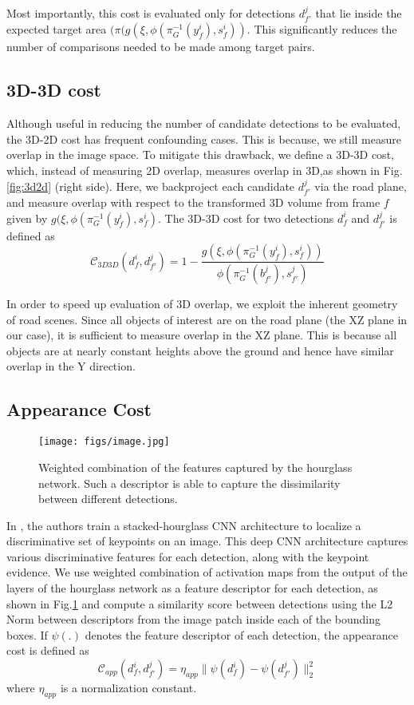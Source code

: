 \documentclass[letterpaper, 10 pt, conference]{ieeeconf}
\begin{document}
Most importantly, this cost is evaluated only for detections $d^j_{f'}$ that lie inside the expected target area $(\pi(g(\xi, \phi(\pi_G^{-1}(y^i_f), s^i_f))$. This significantly reduces the number of comparisons needed to be made among target pairs.

\subsection{3D-3D cost}

Although useful in reducing the number of candidate detections to be evaluated, the 3D-2D cost has frequent confounding cases. This is because, we still measure overlap in the image space. To mitigate this drawback, we define a 3D-3D cost, which, instead of measuring 2D overlap, measures overlap in 3D,as shown in Fig.\ref{fig:3d2d} (right side). Here, we backproject each candidate $d^j_{f'}$ via the road plane, and measure overlap with respect to the transformed 3D volume from frame $f$ given by $g(\xi, \phi(\pi_G^{-1}(y^i_f), s^i_f)$. The 3D-3D cost for two detections $d^i_f$ and $d^j_{f'}$ is defined as
\begin{equation}
\mathcal{C}_{3D3D}(d^i_f, d^j_{f'}) = 1 - \frac{g(\xi, \phi(\pi_G^{-1}(y^i_f), s^i_f))}{\phi(\pi_G^{-1}(b^j_{f'}),s^j_{f'})}
\label{eqn:3D-3D}
\end{equation}

In order to speed up evaluation of 3D overlap, we exploit the inherent geometry of road scenes. Since all objects of interest are on the road plane (the XZ plane in our case), it is sufficient to measure overlap in the XZ plane. This is because all objects are at nearly constant heights above the ground and hence have similar overlap in the Y direction.

\subsection{Appearance Cost}
\begin{figure}
  \centering
  \texttt{[image: figs/image.jpg]}
  \caption{Weighted combination of the features captured by the hourglass network. Such a descriptor is able to capture the dissimilarity between different detections.}
  \label{fig:2d2d}
\end{figure}
In \cite{KM_IROS}, the authors train a stacked-hourglass CNN architecture to localize a discriminative set of keypoints on an image. This deep CNN architecture captures various discriminative features for each detection, along with the keypoint evidence. We use weighted combination of activation maps from the output of the layers of the hourglass network as a feature descriptor for each detection, as shown in Fig.\ref{fig:2d2d}  and compute a similarity score between detections using the L$2$ Norm between descriptors from the image patch inside each of the bounding boxes. If $\psi(.)$ denotes the feature descriptor of each detection, the appearance cost is defined as
\begin{equation}
\mathcal{C}_{app} (d^i_f, d^j_{f'}) = \eta_{app} \| \psi(d^i_f) - \psi(d^j_{f'})  \|_2^2
\label{eqn:appearance}
\end{equation}
where $\eta_{app}$ is a normalization constant.
\end{document}
